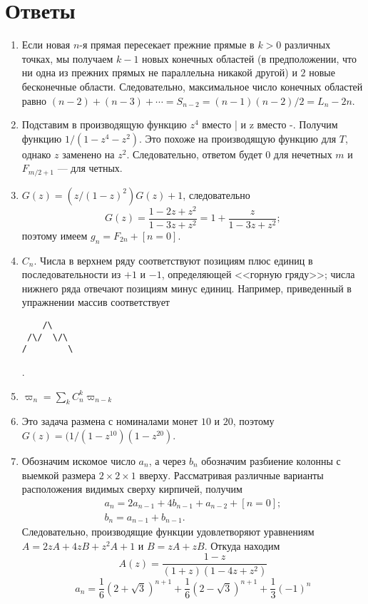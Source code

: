 \documentclass[14pt]{book}
\begin{document}
\section{Ответы}
\begin{enumerate}
\item Если новая $n$-я прямая пересекает прежние прямые в $k>0$ различных точках,
мы получаем $k-1$ новых конечных областей (в предположении, что ни одна из прежних прямых
не параллельна никакой другой) и $2$ новые бесконечные области. Следовательно, максимальное
число конечных областей равно $(n-2) + (n-3) + \cdots = S_{n-2} = (n-1)(n-2)/2 = L_n-2n$.

\item Подставим в производящую функцию $z^4$ вместо | и z вместо -. Получим функцию $1/(1-z^4-z^2)$.
Это похоже на производящую функцию для $T$, однако $z$ заменено на $z^2$. Следовательно, 
ответом будет $0$ для нечетных $m$ и $F_{m/2+1}$ --- для четных.

\item $G(z)=(z/(1-z)^2)G(z)+1$, следовательно 
$$G(z) = \frac{1-2z+z^2}{1-3z+z^2} = 1 + \frac{z}{1-3z+z^2};$$
поэтому имеем $g_n=F_{2n}+[n=0]$.

\item $C_n$. Числа в верхнем ряду соответствуют позициям плюс единиц в последовательности
из $+1$ и $-1$, определяющей <<горную гряду>>; числа нижнего ряда отвечают позициям
минус единиц. Например, приведенный в упражнении массив соответствует
\begin{verbatim}
    /\     
 /\/  \/\  
/        \ 
\end{verbatim}.

\item $\varpi_n = \sum_k C_n^k\varpi_{n-k}$

\item Это задача размена с номиналами монет $10$ и $20$, поэтому $G(z)=(1/(1-z^{10})(1-z^{20})$.

\item Обозначим искомое число $a_n$, а через $b_n$ обозначим разбиение колонны с выемкой размера
      $2 \times 2 \times 1$ вверху. Рассматривая различные варианты расположения видимых сверху
      кирпичей, получим
$$
\begin{array}{ll}
a_n = 2a_{n-1} + 4b_{n-1} + a_{n-2} + [n=0]; \\
b_n = a_{n-1} + b_{n-1}.
\end{array}
$$
      Следовательно, производящие функции удовлетворяют уравнениям $A = 2zA+4zB+z^2A+1$ и
      $B = zA + zB$. Откуда находим $$A(z) = \frac{1-z}{(1+z)(1-4z+z^2)}$$
      $$a_n = \frac{1}{6}(2+\sqrt{3})^{n+1} + \frac{1}{6}(2-\sqrt{3})^{n+1} + \frac{1}{3}(-1)^n$$


\end{enumerate}
\end{document}
